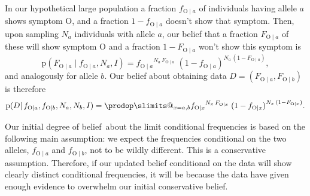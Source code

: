 \documentclass[\ifafour a4paper,12pt,\else a5paper,10pt,\fi%
onecolumn,oneside,article,%
british%
]{memoir}
\makeatletter
\theoremstyle{remark}
\theoremstyle{innote}
\def\prod{\DOTSI\prodop\slimits@}
\newcommand*{\pf}{\mathrm{p}}%
\renewcommand*{\|}{\mathpunct{|}}
\newcommand*{\dob}{degree of belief}
\newcommand*{\yD}{D}
\newcommand*{\yI}{I}
\newcommand*{\ya}{a}
\newcommand*{\yb}{b}
\newcommand*{\ysA}{\textrm{O}}%
\makeatother
\begin{document}
In our hypothetical large population a fraction $f_{\ysA\|\ya}$ of
individuals having allele $\ya$ shows symptom $\ysA$, and a fraction
$1-f_{\ysA\|\ya}$ doesn't show that symptom. Then, upon sampling $N_{\ya}$
individuals with allele $\ya$, our belief that a fraction $F_{\ysA\|\ya}$
of these will show symptom $\ysA$ and a fraction $1-F_{\ysA\|\ya}$ won't
show this symptom is
\begin{equation}
  \label{eq:sampling_belief}
  \pf( F_{\ysA\|\ya} \| f_{\ysA\|\ya},  N_{\ya}, \yI)
  =
  {f_{\ysA\|\ya}}^{N_{\ya}\,F_{\ysA\|\ya}} \;
  {(1-f_{\ysA\|\ya})}^{N_{\ya}\,(1-F_{\ysA\|\ya})},
\end{equation}
and analogously for allele $\yb$. Our belief about obtaining data
$\yD = (F_{\ysA\|\ya}, F_{\ysA\|\yb})$ is therefore
\begin{equation}
  \label{eq:sampling_belief_combined}
  \pf(\yD \|  f_{\ysA\|\ya},f_{\ysA\|\yb}, N_{\ya}, N_{\yb}, \yI)
  =
 \prod_{x=\ya,\yb} {f_{\ysA\|x}}^{N_{x}\,F_{\ysA\|x}} \;
  {(1-f_{\ysA\|x})}^{N_{x}\,(1-F_{\ysA\|x})}.
\end{equation}

\medskip

Our initial \dob\ about the limit conditional frequencies is based on the
following main assumption: we expect the frequencies conditional on the two
alleles, $f_{\ysA\|\ya}$ and $f_{\ysA\|\yb}$, not to be wildly different.
This is a conservative assumption. Therefore, if our updated belief
conditional on the data will show clearly distinct conditional frequencies,
it will be because the data have given enough evidence to overwhelm our
initial conservative belief.
\end{document}

